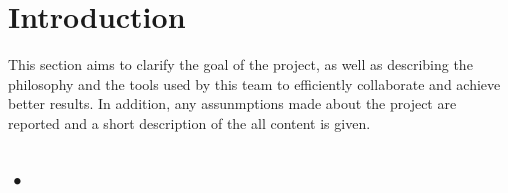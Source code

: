\documentclass{article}
\begin{document}
\tableofcontents
\section*{Introduction}
This section aims to clarify the goal of the project, as well as describing the philosophy and the tools used by this team to efficiently collaborate and achieve better results. In addition, any assunmptions made about the project are reported and a short description of the all content is given.
\subsection*{•}   
\end{document}

